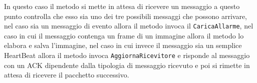 In questo caso il metodo si mette in attesa di ricevere un messaggio a questo punto controlla che esso sia uno dei tre possibili messaggi che possono arrivare, nel caso sia un messaggio di evento allora il metodo invoca il \texttt{CaricaAllarme}, nel caso in cui il messaggio contenga un frame di un immagine allora il metodo lo elabora e salva l'immagine, nel caso in cui invece il messaggio sia un semplice HeartBeat allora il metodo invoca \texttt{AggiornaRicevitore} e risponde al messaggio con un ACK dipendente dalla tipologia di messaggio ricevuto e poi si rimette in attesa di ricevere il pacchetto successivo.